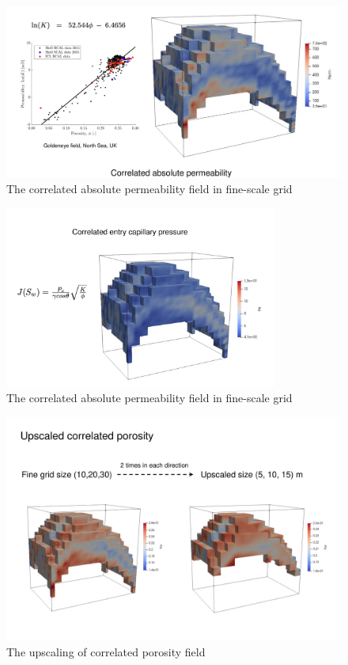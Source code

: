 \documentclass{article}
\begin{document}
\begin{figure}[H]
    \centering    \centerline{\includegraphics[width=1.1\textwidth]{Figures/Permeability.pdf}}
    \caption{The correlated absolute permeability field in fine-scale grid}\label{Permeability}
\end{figure}

\begin{figure}[H]
    \centering    \centerline{\includegraphics[width=0.8\textwidth]{Figures/Pe.pdf}}
    \caption{The correlated absolute permeability field in fine-scale grid}\label{Pe}
\end{figure}

\begin{figure}[H]
    \centering    \centerline{\includegraphics[width=1\textwidth]{Figures/porosity2.pdf}}
    \caption{The upscaling of correlated porosity field}\label{porosity2}
\end{figure}
\end{document}
